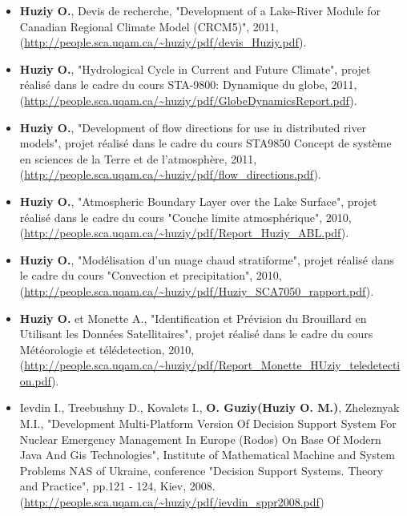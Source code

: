 \vspace{\vertspace}

{
\renewcommand{\labelitemi}{}

\begin{itemize}
    \item \textbf{Huziy O.}, Devis de recherche, "Development of a
    Lake-River Module for Canadian Regional Climate Model (CRCM5)", 2011,
    (\url{http://people.sca.uqam.ca/~huziy/pdf/devis_Huziy.pdf}).

    \item \textbf{Huziy O.}, "Hydrological Cycle in Current and Future Climate",
    projet réalisé dans le cadre du cours STA-9800: Dynamique du globe, 2011,\\
     (\url{http://people.sca.uqam.ca/~huziy/pdf/GlobeDynamicsReport.pdf}).

    \item \textbf{Huziy O.}, "Development of flow directions for use in
    distributed river models", projet réalisé dans le cadre du cours STA9850
    Concept de système en sciences de la Terre et de l'atmosphère, 2011,
    (\url{http://people.sca.uqam.ca/~huziy/pdf/flow_directions.pdf}).

    \item \textbf{Huziy O.}, "Atmospheric Boundary Layer over the Lake Surface",
           projet réalisé dans le cadre du cours "Couche limite atmosphérique",
           2010, (\url{http://people.sca.uqam.ca/~huziy/pdf/Report_Huziy_ABL.pdf}).

    \item \textbf{Huziy O.}, "Modélisation d’un nuage chaud stratiforme",
       projet réalisé dans le cadre du cours "Convection et precipitation", 2010,
       (\url{http://people.sca.uqam.ca/~huziy/pdf/Huziy_SCA7050_rapport.pdf}).

    \item \textbf{Huziy O.} et Monette A., "Identification et Prévision du
    Brouillard en Utilisant les Données Satellitaires", projet réalisé dans le cadre du cours Météorologie et télédetection,
       2010, (\url{http://people.sca.uqam.ca/~huziy/pdf/Report_Monette_HUziy_teledetection.pdf}).


    \item Ievdin I., Treebushny D., Kovalets I., \textbf{O. Guziy(Huziy O.
    M.)}, Zheleznyak M.I., "Development Multi-Platform Version Of Decision
    Support System For Nuclear Emergency Management In Europe (Rodos) On Base Of Modern Java And Gis Technologies",
    Institute of Mathematical Machine and System Problems NAS of Ukraine, conference
    "Decision Support Systems. Theory and Practice", pp.121 - 124, Kiev, 2008.
     (\url{http://people.sca.uqam.ca/~huziy/pdf/ievdin_sppr2008.pdf})
\end{itemize}
}
